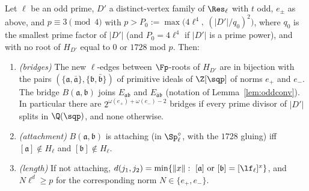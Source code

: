 \begin{theorem}\label{thm:Aodd}
Let $\ell$ be an odd prime, $D'$ a distinct-vertex family of $\Res_\ell$ with $t$ odd, $e_\pm$ as above, and
$p\equiv3\pmod4$ with $p>P_0:=\max\bigl(4\ell^4,\ (|D'|/q_0)^2\bigr)$, where $q_0$ is the smallest prime factor of $|D'|$
(and $P_0=4\ell^4$ if $|D'|$ is a prime power), and with no root of $H_{D'}$ equal to $0$ or $1728$ mod $p$.  Then:
\begin{enumerate}[label=(\alph*)]
\item \emph{(bridges)} The new $\ell$-edges between $\Fp$-roots of $H_{D'}$ are in bijection with the pairs
  $(\{\mathfrak a,\bar{\mathfrak a}\},\{\mathfrak b,\bar{\mathfrak b}\})$ of primitive ideals of $\Z[\sqp]$ of norms $e_+$ and $e_-$.
  The bridge $B(\mathfrak a,\mathfrak b)$ joins $E_{\mathfrak a\mathfrak b}$ and $E_{\bar{\mathfrak a}\mathfrak b}$ (notation of
  Lemma~\ref{lem:oddconv}).  In particular there are $2^{\omega(e_+)+\omega(e_-)-2}$ bridges if every prime divisor of $|D'|$ splits
  in $\Q(\sqp)$, and none otherwise.
\item \emph{(attachment)} $B(\mathfrak a,\mathfrak b)$ is attaching (in $\Sp^\circ_\ell$, with the $1728$ gluing) iff
  $[\mathfrak a]\notin H_\ell$ and $[\mathfrak b]\notin H_\ell$.
\item \emph{(length)} If not attaching, $d(j_1,j_2)=\min\{\|x\|:\ [\mathfrak a]\text{ or }[\mathfrak b]=[\lf_\ell]^x\}$, and
  $N\ell^{d}\ge p$ for the corresponding norm $N\in\{e_+,e_-\}$.
\end{enumerate}
\end{theorem}
